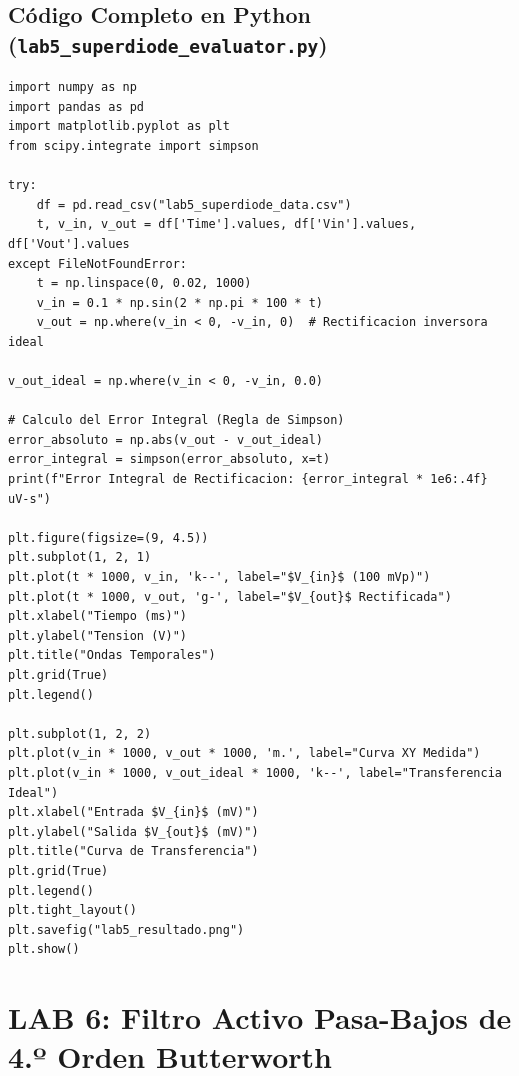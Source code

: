 \documentclass[10pt,a4paper,twoside]{article}
\begin{document}
\subsection{Código Completo en Python (\texttt{lab5\_superdiode\_evaluator.py})}
\begin{lstlisting}
import numpy as np
import pandas as pd
import matplotlib.pyplot as plt
from scipy.integrate import simpson

try:
    df = pd.read_csv("lab5_superdiode_data.csv")
    t, v_in, v_out = df['Time'].values, df['Vin'].values, df['Vout'].values
except FileNotFoundError:
    t = np.linspace(0, 0.02, 1000)
    v_in = 0.1 * np.sin(2 * np.pi * 100 * t)
    v_out = np.where(v_in < 0, -v_in, 0)  # Rectificacion inversora ideal

v_out_ideal = np.where(v_in < 0, -v_in, 0.0)

# Calculo del Error Integral (Regla de Simpson)
error_absoluto = np.abs(v_out - v_out_ideal)
error_integral = simpson(error_absoluto, x=t)
print(f"Error Integral de Rectificacion: {error_integral * 1e6:.4f} uV-s")

plt.figure(figsize=(9, 4.5))
plt.subplot(1, 2, 1)
plt.plot(t * 1000, v_in, 'k--', label="$V_{in}$ (100 mVp)")
plt.plot(t * 1000, v_out, 'g-', label="$V_{out}$ Rectificada")
plt.xlabel("Tiempo (ms)")
plt.ylabel("Tension (V)")
plt.title("Ondas Temporales")
plt.grid(True)
plt.legend()

plt.subplot(1, 2, 2)
plt.plot(v_in * 1000, v_out * 1000, 'm.', label="Curva XY Medida")
plt.plot(v_in * 1000, v_out_ideal * 1000, 'k--', label="Transferencia Ideal")
plt.xlabel("Entrada $V_{in}$ (mV)")
plt.ylabel("Salida $V_{out}$ (mV)")
plt.title("Curva de Transferencia")
plt.grid(True)
plt.legend()
plt.tight_layout()
plt.savefig("lab5_resultado.png")
plt.show()
\end{lstlisting}

\newpage
\section{LAB 6: Filtro Activo Pasa-Bajos de 4.º Orden Butterworth}
\end{document}
